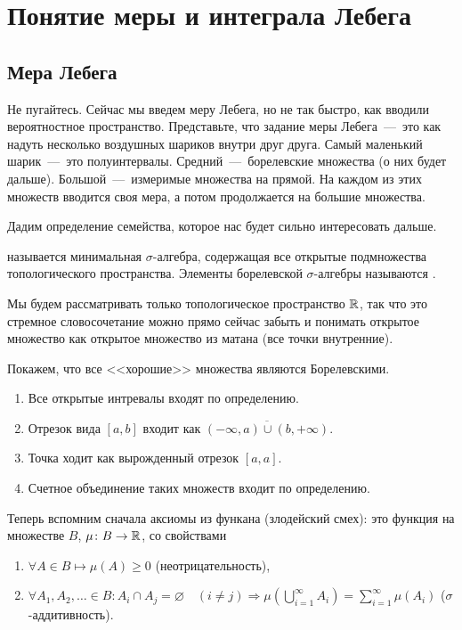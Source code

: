 \documentclass[../TV&MS.tex]{subfiles}
\begin{document}
\section{Понятие меры и интеграла Лебега}

\subsection{Мера Лебега}

\qquad Не пугайтесь. Сейчас мы введем меру Лебега, но не так быстро, как 
вводили вероятностное пространство. Представьте, что задание меры Лебега~---~это
как надуть несколько воздушных шариков внутри друг друга. Самый маленький 
шарик~---~это полуинтервалы. Средний~---~борелевские множества (о них будет
дальше). Большой~---~измеримые множества на прямой. На каждом из этих множеств
вводится своя мера, а потом продолжается на большие множества.

Дадим определение семейства, которое нас будет сильно интересовать дальше.

\begin{Def}
 называется минимальная $\sigma$-алгебра, 
содержащая все открытые подмножества топологического пространства. Элементы 
борелевской $\sigma$-алгебры называются .
\end{Def}

\begin{Wtf}
Мы будем рассматривать только топологическое пространство $\mathbb{R}$, так что это стремное 
словосочетание можно прямо сейчас забыть и понимать открытое множество как открытое множество 
из матана (все точки внутренние).
\end{Wtf}

\begin{Ex}
Покажем, что все <<хорошие>> множества являются Борелевскими.
\begin{enumerate}
\item Все открытые интревалы входят по определению.
\item Отрезок вида $[a, b]$ входит как $\overline{(-\infty, a) \cup (b, +\infty)}$.
\item Точка ходит как вырожденный отрезок $[a, a]$.
\item Счетное объединение таких множеств входит по определению.
\end{enumerate}
\end{Ex}

\begin{Def}
Теперь вспомним сначала аксиомы  
из функана (злодейский смех): это функция на множестве 
$B$, $\mu \colon B \to \mathbb{R}$, со свойствами
\begin{enumerate}
	\item $\forall A \in B \mapsto \mu(A) \ge 0$ (неотрицательность),
	\item $\forall A_1, A_2, \ldots \in B \colon A_i\cap A_j = \varnothing 
	\quad (i \not= j) \Rightarrow \mu\left(\bigcup\limits_{i=1}^\infty A_i\right) =
	\sum\limits_{i=1}^\infty \mu(A_i)$ ($\sigma$-аддитивность).
\end{enumerate} 
\end{Def}
\end{document}
